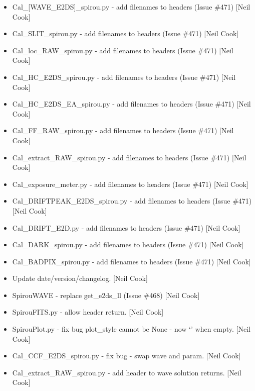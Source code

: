 \documentclass[a4paper,10pt,english]{report}
\begin{document}
\begin{itemize}
\item {} 
Cal\_{[}WAVE\_E2DS{]}\_spirou.py - add filenames to headers (Issue  \#471)
{[}Neil Cook{]}

\item {} 
Cal\_SLIT\_spirou.py - add filenames to headers (Issue  \#471) {[}Neil
Cook{]}

\item {} 
Cal\_loc\_RAW\_spirou.py - add filenames to headers (Issue  \#471) {[}Neil
Cook{]}

\item {} 
Cal\_HC\_E2DS\_spirou.py - add filenames to headers (Issue  \#471) {[}Neil
Cook{]}

\item {} 
Cal\_HC\_E2DS\_EA\_spirou.py - add filenames to headers (Issue  \#471)
{[}Neil Cook{]}

\item {} 
Cal\_FF\_RAW\_spirou.py - add filenames to headers (Issue  \#471) {[}Neil
Cook{]}

\item {} 
Cal\_extract\_RAW\_spirou.py - add filenames to headers (Issue  \#471)
{[}Neil Cook{]}

\item {} 
Cal\_exposure\_meter.py - add filenames to headers (Issue  \#471) {[}Neil
Cook{]}

\item {} 
Cal\_DRIFTPEAK\_E2DS\_spirou.py - add filenames to headers (Issue  \#471)
{[}Neil Cook{]}

\item {} 
Cal\_DRIFT\_E2D.py - add filenames to headers (Issue  \#471) {[}Neil Cook{]}

\item {} 
Cal\_DARK\_spirou.py - add filenames to headers (Issue  \#471) {[}Neil
Cook{]}

\item {} 
Cal\_BADPIX\_spirou.py - add filenames to headers (Issue  \#471) {[}Neil
Cook{]}

\item {} 
Update date/version/changelog. {[}Neil Cook{]}

\item {} 
SpirouWAVE - replace get\_e2ds\_ll (Issue \#468) {[}Neil Cook{]}

\item {} 
SpirouFITS.py - allow header return. {[}Neil Cook{]}

\item {} 
SpirouPlot.py - fix bug plot\_style cannot be None - now ‘’ when empty.
{[}Neil Cook{]}

\item {} 
Cal\_CCF\_E2DS\_spirou.py - fix bug - swap wave and param. {[}Neil Cook{]}

\item {} 
Cal\_extract\_RAW\_spirou.py - add header to wave solution returns. {[}Neil
Cook{]}

\end{itemize}
\end{document}

